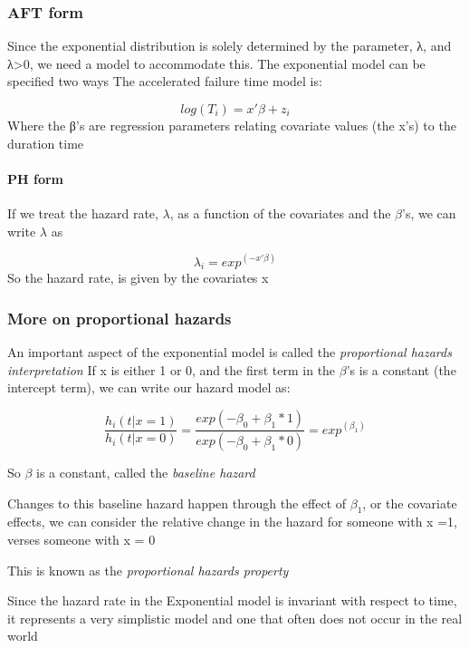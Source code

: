 \documentclass[
]{article}
\begin{document}
\hypertarget{aft-form}{%
\subsubsection{AFT form}\label{aft-form}}

Since the exponential distribution is solely determined by the
parameter, λ, and λ\textgreater0, we need a model to accommodate this.
The exponential model can be specified two ways The accelerated failure
time model is:

\[log(T_i) = x'\beta + z_i\] Where the β's are regression parameters
relating covariate values (the x's) to the duration time

\hypertarget{ph-form}{%
\paragraph{PH form}\label{ph-form}}

If we treat the hazard rate, \(\lambda\), as a function of the
covariates and the \(\beta\)'s, we can write \(\lambda\) as

\[\lambda_i=exp^{(- x'β)}\] So the hazard rate, is given by the
covariates x

\hypertarget{more-on-proportional-hazards}{%
\subsubsection{More on proportional
hazards}\label{more-on-proportional-hazards}}

An important aspect of the exponential model is called the
\emph{proportional hazards interpretation} If x is either 1 or 0, and
the first term in the \(\beta\)'s is a constant (the intercept term), we
can write our hazard model as:

\[\frac{h_i(t|x=1)}{h_i(t|x=0)}= \frac{exp(-\beta_0 + \beta_1 * 1)}{exp(-\beta_0 + \beta_1 * 0)} = exp^{(\beta_1)}\]

So \(\beta\) is a constant, called the \emph{baseline hazard}

Changes to this baseline hazard happen through the effect of
\(\beta_1\), or the covariate effects, we can consider the relative
change in the hazard for someone with x =1, verses someone with x = 0

This is known as the \emph{proportional hazards property}

Since the hazard rate in the Exponential model is invariant with respect
to time, it represents a very simplistic model and one that often does
not occur in the real world
\end{document}
